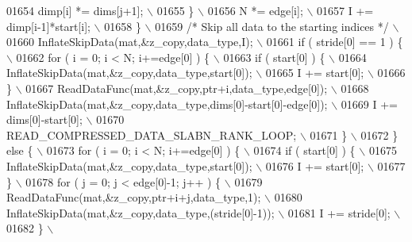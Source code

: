 \begin{DoxyCode}
{{{{{{{{{01654 \textcolor{preprocessor}{                dimp[i] *= dims[j+1]; \(\backslash\)}
01655 \textcolor{preprocessor}{            \} \(\backslash\)}
01656 \textcolor{preprocessor}{            N *= edge[i]; \(\backslash\)}
01657 \textcolor{preprocessor}{            I += dimp[i-1]*start[i]; \(\backslash\)}
01658 \textcolor{preprocessor}{        \} \(\backslash\)}
01659 \textcolor{preprocessor}{        }\textcolor{comment}{/* Skip all data to the starting indices */}\textcolor{preprocessor}{ \(\backslash\)}
01660 \textcolor{preprocessor}{        InflateSkipData(mat,&z\_copy,data\_type,I); \(\backslash\)}
01661 \textcolor{preprocessor}{        if ( stride[0] == 1 ) \{ \(\backslash\)}
01662 \textcolor{preprocessor}{            for ( i = 0; i < N; i+=edge[0] ) \{ \(\backslash\)}
01663 \textcolor{preprocessor}{                if ( start[0] ) \{ \(\backslash\)}
01664 \textcolor{preprocessor}{                    InflateSkipData(mat,&z\_copy,data\_type,start[0]); \(\backslash\)}
01665 \textcolor{preprocessor}{                    I += start[0]; \(\backslash\)}
01666 \textcolor{preprocessor}{                \} \(\backslash\)}
01667 \textcolor{preprocessor}{                ReadDataFunc(mat,&z\_copy,ptr+i,data\_type,edge[0]); \(\backslash\)}
01668 \textcolor{preprocessor}{                InflateSkipData(mat,&z\_copy,data\_type,dims[0]-start[0]-edge[0]); \(\backslash\)}
01669 \textcolor{preprocessor}{                I += dims[0]-start[0]; \(\backslash\)}
01670 \textcolor{preprocessor}{                READ\_COMPRESSED\_DATA\_SLABN\_RANK\_LOOP; \(\backslash\)}
01671 \textcolor{preprocessor}{            \} \(\backslash\)}
01672 \textcolor{preprocessor}{        \} else \{ \(\backslash\)}
01673 \textcolor{preprocessor}{            for ( i = 0; i < N; i+=edge[0] ) \{ \(\backslash\)}
01674 \textcolor{preprocessor}{                if ( start[0] ) \{ \(\backslash\)}
01675 \textcolor{preprocessor}{                    InflateSkipData(mat,&z\_copy,data\_type,start[0]); \(\backslash\)}
01676 \textcolor{preprocessor}{                    I += start[0]; \(\backslash\)}
01677 \textcolor{preprocessor}{                \} \(\backslash\)}
01678 \textcolor{preprocessor}{                for ( j = 0; j < edge[0]-1; j++ ) \{ \(\backslash\)}
01679 \textcolor{preprocessor}{                    ReadDataFunc(mat,&z\_copy,ptr+i+j,data\_type,1); \(\backslash\)}
01680 \textcolor{preprocessor}{                    InflateSkipData(mat,&z\_copy,data\_type,(stride[0]-1)); \(\backslash\)}
01681 \textcolor{preprocessor}{                    I += stride[0]; \(\backslash\)}
01682 \textcolor{preprocessor}{                \} \(\backslash\)}
}}}}}}}}}
\end{DoxyCode}
